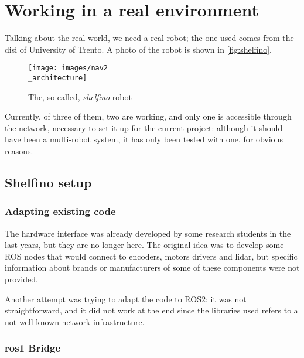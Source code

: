   

\chapter{Working in a real environment}
\label{cha:realworld}

Talking about the real world, we need a real robot; the one used comes from the \acrfull{disi} of University of Trento.
A photo of the robot is shown in \autoref{fig:shelfino}. %

\begin{figure}[h]
  \centering
  \texttt{[image: images/nav2\\\_architecture]}
  \caption{The, so called, \textit{shelfino} robot}
  \label{fig:shelfino}
\end{figure}

Currently, of three of them, two are working, and only one is accessible through the network, necessary to set it up for the current project: although it should have been a multi-robot system, it has only been tested with one, for obvious reasons.

\section{Shelfino setup} 

\subsection{Adapting existing code}

The hardware interface was already developed by some research students in the last years, but they are no longer here. The original idea was to develop some ROS nodes that would connect to encoders, motors drivers and lidar, but specific information about brands or manufacturers of some of these components were not provided.

Another attempt was trying to adapt the code to ROS2: it was not straightforward, and it did not work at the end since the libraries used refers to a not well-known network infrastructure.


\subsection{\acrshort{ros}1 Bridge}

